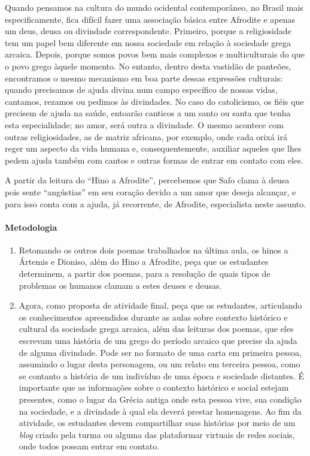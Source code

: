 \documentclass[12pt]{extarticle}
\begin{document}
Quando pensamos na cultura do mundo ocidental contemporâneo, no Brasil mais
especificamente, fica difícil fazer uma associação básica entre Afrodite e apenas
um deus, deusa ou divindade correspondente. Primeiro, porque a religiosidade
tem um papel bem diferente em nossa sociedade em relação à sociedade grega
arcaica. Depois, porque somos povos bem mais complexos e multiculturais do que 
o povo grego àquele momento. No entanto, dentro desta vastidão de panteões,
encontramos o mesmo mecanismo em boa parte dessas expressões culturais: 
quando precisamos de ajuda divina num campo específico de nossas vidas, 
cantamos, rezamos ou pedimos às divindades. No caso do catolicismo, os fiéis
que precisem de ajuda na saúde, entoarão canticos a um santo ou santa que
tenha esta especialidade; no amor, será outra a divindade. O mesmo acontece
com outras religiosidades, as de matriz africana, por exemplo, onde cada
orixá irá reger um aspecto da vida humana e, consequentemente, auxiliar 
aqueles que lhes pedem ajuda também com cantos e outras formas de entrar
em contato com eles.

A partir da leitura do ``Hino a Afrodite'', percebemos que Safo clama
à deusa pois sente ``angústias'' em seu coração devido a um amor
que deseja alcançar, e para isso conta com a ajuda, já recorrente,
de Afrodite, especialista neste assunto. 


\paragraph{Metodologia}

\begin{enumerate}

	\item
	Retomando os outros dois poemas trabalhados na última aula, os hinos a 
	Ártemis e Dioniso, além do Hino a Afrodite, peça que os estudantes 
	determinem, a partir dos poemas, para a resolução de quais tipos de 
	problemas os humanos clamam a estes deuses e deusas. 

	\item
	Agora, como proposta de atividade final, peça que os estudantes, articulando
	os conhecimentos apreendidos durante as aulas sobre contexto histórico e cultural
	da sociedade grega arcaica, além das leituras dos poemas, que eles escrevam 
	uma história de um grego do período arcaico que precise da ajuda de alguma
	divindade. Pode ser no formato de uma carta em primeira pessoa, assumindo o lugar
	desta personagem, ou um relato em terceira pessoa, como se contanto a história
	de um indivíduo de uma época e sociedade distantes. É importante que as informações 
	sobre o contexto histórico e social estejam presentes, como o lugar da Grécia antiga 
	onde esta pessoa vive, sua condição na sociedade, e a divindade à qual ela deverá
	prestar homenagens. 
	Ao fim da atividade, os estudantes devem compartilhar suas histórias por meio de um
	\textit{blog} criado pela turma ou alguma das plataformar virtuais de redes sociais,
	onde todos possam entrar em contato.


\end{enumerate}
\end{document}
